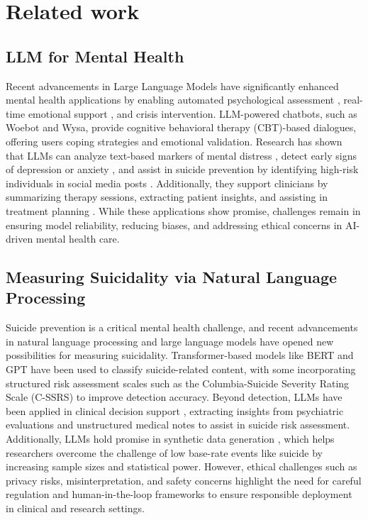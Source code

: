 \section{Related work}
\subsection{LLM for Mental Health}
Recent advancements in Large Language Models have significantly enhanced mental health applications \cite{related1, related2} by enabling automated psychological assessment \cite{related3}, real-time emotional support \cite{related4}, and crisis intervention. LLM-powered chatbots, such as Woebot \cite{related11} and Wysa\cite{related12}, provide cognitive behavioral therapy (CBT)-based dialogues, offering users coping strategies and emotional validation. Research has shown that LLMs can analyze text-based markers of mental distress \cite{related14}, detect early signs of depression or anxiety \cite{related15}, and assist in suicide prevention by identifying high-risk individuals in social media posts \cite{related13}. Additionally, they support clinicians by summarizing therapy sessions, extracting patient insights, and assisting in treatment planning \cite{related16}. While these applications show promise, challenges remain in ensuring model reliability, reducing biases, and addressing ethical concerns \cite{related17} in AI-driven mental health care.

\subsection{Measuring Suicidality via Natural Language Processing}
Suicide prevention is a critical mental health challenge, and recent advancements in natural language processing and large language models have opened new possibilities for measuring suicidality. Transformer-based models like BERT and GPT \cite{related5,related6} have been used to classify suicide-related content, with some incorporating structured risk assessment scales such as the Columbia-Suicide Severity Rating Scale (C-SSRS) to improve detection accuracy. Beyond detection, LLMs have been applied in clinical decision support \cite{related7}, extracting insights from psychiatric evaluations \cite{related9} and unstructured medical notes \cite{related8} to assist in suicide risk assessment. Additionally, LLMs hold promise in synthetic data generation \cite{ghanadian2024socially}, which helps researchers overcome the challenge of low base-rate events like suicide by increasing sample sizes and statistical power. However, ethical challenges \cite{related10} such as privacy risks, misinterpretation, and safety concerns highlight the need for careful regulation and human-in-the-loop frameworks to ensure responsible deployment in clinical and research settings. 
